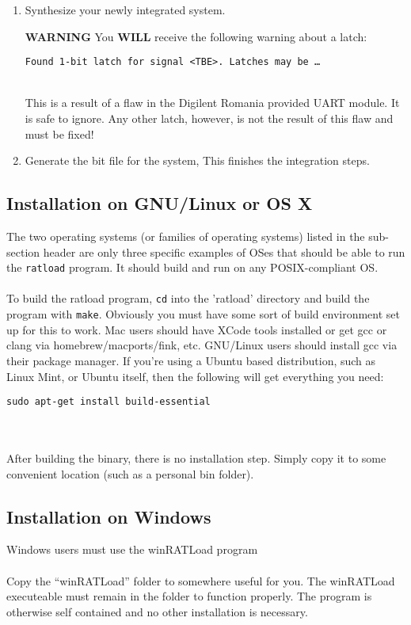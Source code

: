 \documentclass[notitlepage]{article}
\newcommand{\warningsign}{\fontencoding{U}\fontfamily{futs}\Large\selectfont\char 66\relax}
\begin{document}
\begin{enumerate}
\item Synthesize your newly integrated system.
\begin{infobox}
\textbf{{\warningsign} WARNING} You \textbf{WILL} receive the following warning about a latch:\\
\centerline{\texttt{Found 1-bit latch for signal \textless TBE\textgreater. Latches may be \ldots}}\\
This is a result of a flaw in the Digilent Romania provided UART module. It is safe to ignore. Any other latch, however, is not the result of this flaw and must be fixed!
\end{infobox}

\item Generate the bit file for the system, This finishes the integration steps.
\end{enumerate}

\subsection{Installation on GNU/Linux or OS X}
The two operating systems (or families of operating systems) listed in the sub-section header are only three specific examples of OSes that should be able to run the \texttt{ratload} program. It should build and run on any POSIX-compliant OS.\\\\
To build the ratload program, \texttt{cd} into the 'ratload' directory and build the program with \texttt{make}. Obviously you must have some sort of build environment set up for this to work. Mac users should have XCode tools installed or get gcc or clang via homebrew/macports/fink, etc. GNU/Linux users should install gcc via their package manager. If you're using a Ubuntu based distribution, such as Linux Mint, or Ubuntu itself, then the following will get everything you need:\\
\centerline{\texttt{sudo apt-get install build-essential}}\\\\
After building the binary, there is no installation step. Simply copy it to some convenient location (such as a personal bin folder).

\subsection{Installation on Windows}
Windows users must use the winRATLoad program\\\\
Copy the ``winRATLoad'' folder to somewhere useful for you. The winRATLoad executeable must remain in the folder to function properly. The program is otherwise self contained and no other installation is necessary.
\end{document}
